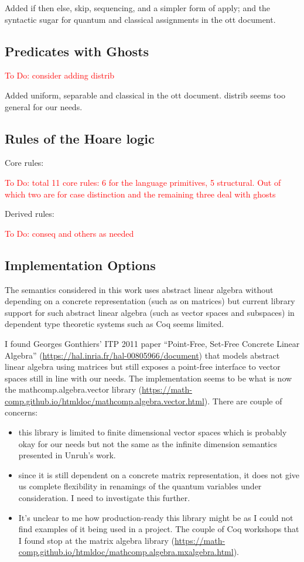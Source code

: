\documentclass[acmsmall,nonacm,timestamp,review=false,anonymous=false]{acmart}
\newcommand{\todo}[1]{\textcolor{red}{#1}}
\begin{document}
Added if then else, skip, sequencing, and a simpler form of apply; and the syntactic sugar for quantum and classical assignments in the ott document.

\subsection{Predicates with Ghosts}
\todo{To Do: consider adding distrib}

Added uniform, separable and classical in the ott document. distrib seems too general for our needs.

\subsection{Rules of the Hoare logic}

Core rules:

\todo{To Do: total 11 core rules: 6 for the language primitives, 5 structural. Out of which two are for case distinction and the remaining three deal with ghosts}

Derived rules:

\todo{To Do: conseq and others as needed}

\subsection{Implementation Options}

The semantics considered in this work uses abstract linear algebra without depending on a concrete representation (such as on matrices) but current library support for such abstract linear algebra (such as vector spaces and subspaces) in dependent type theoretic systems such as Coq seems limited.

I found Georges Gonthiers' ITP 2011 paper ``Point-Free, Set-Free Concrete Linear Algebra'' (\url{https://hal.inria.fr/hal-00805966/document}) that models abstract linear algebra using matrices but still exposes a point-free interface to vector spaces still in line with our needs. The implementation seems to be what is now the mathcomp.algebra.vector library (\url{https://math-comp.github.io/htmldoc/mathcomp.algebra.vector.html}). There are couple of concerns:

\begin{itemize}
	\item this library is limited to finite dimensional vector spaces which is probably okay for our needs but not the same as the infinite dimension semantics presented in Unruh's work.
	\item since it is still dependent on a concrete matrix representation, it does not give us complete flexibility in renamings of the quantum variables under consideration. I need to investigate this further.
	\item It's unclear to me how production-ready this library might be as I could not find examples of it being used in a project. The couple of Coq workshops that I found stop at the matrix algebra library (\url{https://math-comp.github.io/htmldoc/mathcomp.algebra.mxalgebra.html}).
\end{itemize}
\end{document}
